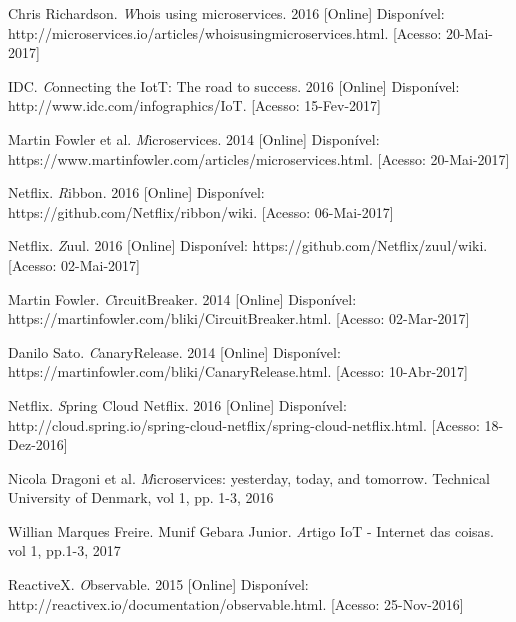 \documentclass[journal]{IEEEtran}
\begin{document}
\begin{thebibliography}{1}
Chris Richardson. \emph Whois using microservices. 2016 [Online] Disponível: http://microservices.io/articles/whoisusingmicroservices.html. [Acesso: 20-Mai-2017]

IDC. \emph Connecting the IotT: The road to success. 2016 [Online] Disponível: http://www.idc.com/infographics/IoT. [Acesso: 15-Fev-2017]

Martin Fowler et al. \emph Microservices. 2014 [Online] Disponível: https://www.martinfowler.com/articles/microservices.html. [Acesso: 20-Mai-2017]

Netflix. \emph Ribbon. 2016 [Online] Disponível: https://github.com/Netflix/ribbon/wiki. [Acesso: 06-Mai-2017]

Netflix. \emph Zuul. 2016 [Online] Disponível: https://github.com/Netflix/zuul/wiki. [Acesso: 02-Mai-2017]

Martin Fowler. \emph CircuitBreaker. 2014 [Online] Disponível: https://martinfowler.com/bliki/CircuitBreaker.html. [Acesso: 02-Mar-2017]

Danilo Sato. \emph CanaryRelease. 2014 [Online] Disponível: https://martinfowler.com/bliki/CanaryRelease.html. [Acesso: 10-Abr-2017]

Netflix. \emph Spring Cloud Netflix. 2016 [Online] Disponível: http://cloud.spring.io/spring-cloud-netflix/spring-cloud-netflix.html. [Acesso: 18-Dez-2016]

Nicola Dragoni et al. \emph Microservices: yesterday, today, and tomorrow. Technical University of Denmark, vol 1, pp. 1-3, 2016

Willian Marques Freire. Munif Gebara Junior. \emph Artigo IoT - Internet das coisas. vol 1, pp.1-3, 2017

ReactiveX. \emph Observable. 2015 [Online] Disponível: http://reactivex.io/documentation/observable.html. [Acesso: 25-Nov-2016]

\end{thebibliography}

% 
\end{document}
